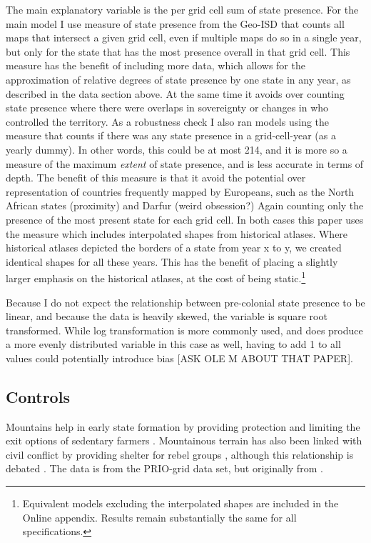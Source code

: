 \documentclass[12pt]{article}
\begin{document}
The main explanatory variable is the per grid cell sum of state presence. For
the main model I use measure of state presence from the Geo-ISD that counts all
maps that intersect a given grid cell, even if multiple maps do so in a single
year, but only for the state that has the most presence overall in that grid
cell. This measure has the benefit of including more data, which allows for the
approximation of relative degrees of state presence by one state in any year, as
described in the data section above. At the same time it avoids over counting
state presence where there were overlaps in sovereignty or changes in who
controlled the territory. As a robustness check I also ran models using the
measure that counts if there was any state presence in a grid-cell-year (as a
yearly dummy). In other words, this could be at most 214, and it is more so a
measure of the maximum \textit{extent} of state presence, and is less accurate
in terms of depth. The benefit of this measure is that it avoid the potential
over representation of countries frequently mapped by Europeans, such as the
North African states (proximity) and Darfur (weird obsession?) Again counting
only the presence of the most present state for each grid cell. In both cases
this paper uses the measure which includes interpolated shapes from historical
atlases. Where historical atlases depicted the borders of a state from year x to
y, we created identical shapes for all these years. This has the benefit of
placing a slightly larger emphasis on the historical atlases, at the cost of
being static.\footnote{Equivalent models excluding the interpolated shapes are
included in the Online appendix. Results remain substantially the same for all
specifications.}

Because I do not expect the relationship between pre-colonial state presence to
be linear, and because the data is heavily skewed, the variable is square root
transformed. While log transformation is more commonly used, and does produce a
more evenly distributed variable in this case as well, having to add 1 to
all values could potentially introduce bias [ASK OLE M ABOUT THAT PAPER]. 

\subsection{Controls}

Mountains help in early state formation by providing protection and limiting the
exit options of sedentary farmers \citep{Carneiro1988}. Mountainous terrain has
also been linked with civil conflict by providing shelter for rebel groups
\citep{Hegre2006}, although this relationship is debated 
\citep{Buhaug2002}. The data is from the PRIO-grid data set, but originally 
from \citet{Blyth2002}. 
\end{document}
